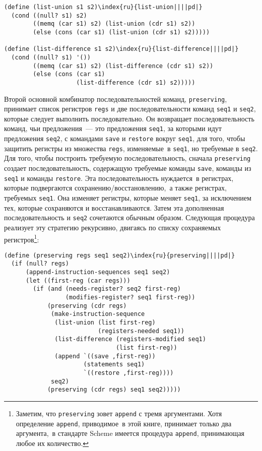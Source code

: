\begin{Verbatim}[fontsize=\small]
(define (list-union s1 s2)\index{ru}{list-union||||pd|}
  (cond ((null? s1) s2)
        ((memq (car s1) s2) (list-union (cdr s1) s2))
        (else (cons (car s1) (list-union (cdr s1) s2)))))

(define (list-difference s1 s2)\index{ru}{list-difference||||pd|}
  (cond ((null? s1) '())
        ((memq (car s1) s2) (list-difference (cdr s1) s2))
        (else (cons (car s1)
                    (list-difference (cdr s1) s2)))))
\end{Verbatim}

Второй основной комбинатор последовательностей команд,
{\tt preserving}, принимает список регистров {\tt regs}
и две последовательности команд {\tt seq1} и {\tt seq2},
которые следует выполнить последовательно.  Он возвращает
последовательность команд, чьи предложения~--- это предложения
{\tt seq1}, за которыми идут предложения {\tt seq2}, с
командами {\tt save} и {\tt restore} вокруг
{\tt seq1}, для того, чтобы защитить регистры из множества
{\tt regs}, изменяемые~в {\tt seq1}, но требуемые в
{\tt seq2}.  Для того, чтобы построить требуемую
последовательность, сначала {\tt preserving} создает
последовательность, содержащую требуемые команды {\tt save},
команды из {\tt seq1} и команды {\tt restore}.  Эта
последовательность нуждается~в регистрах, которые подвергаются
сохранению/восстановлению,~а также регистрах, требуемых
{\tt seq1}. Она изменяет регистры, которые меняет
{\tt seq1}, за исключением тех, которые сохраняются и
восстанавливаются.  Затем эта дополненная последовательность и
{\tt seq2} сочетаются обычным образом.  Следующая процедура
реализует эту стратегию рекурсивно, двигаясь по списку сохраняемых
регистров\footnote{Заметим, что {\tt preserving} зовет
{\tt append} с тремя аргументами.  Хотя определение
{\tt append}, приводимое~в этой книге, принимает только два
аргумента,~в стандарте Scheme имеется процедура
{\tt append}, принимающая любое их количество.
}:

\begin{Verbatim}[fontsize=\small]
(define (preserving regs seq1 seq2)\index{ru}{preserving||||pd|}
  (if (null? regs)
      (append-instruction-sequences seq1 seq2)
      (let ((first-reg (car regs)))
        (if (and (needs-register? seq2 first-reg)
                 (modifies-register? seq1 first-reg))
            (preserving (cdr regs)
             (make-instruction-sequence
              (list-union (list first-reg)
                          (registers-needed seq1))
              (list-difference (registers-modified seq1)
                               (list first-reg))
              (append `((save ,first-reg))
                      (statements seq1)
                      `((restore ,first-reg))))
             seq2)
            (preserving (cdr regs) seq1 seq2)))))
\end{Verbatim}

